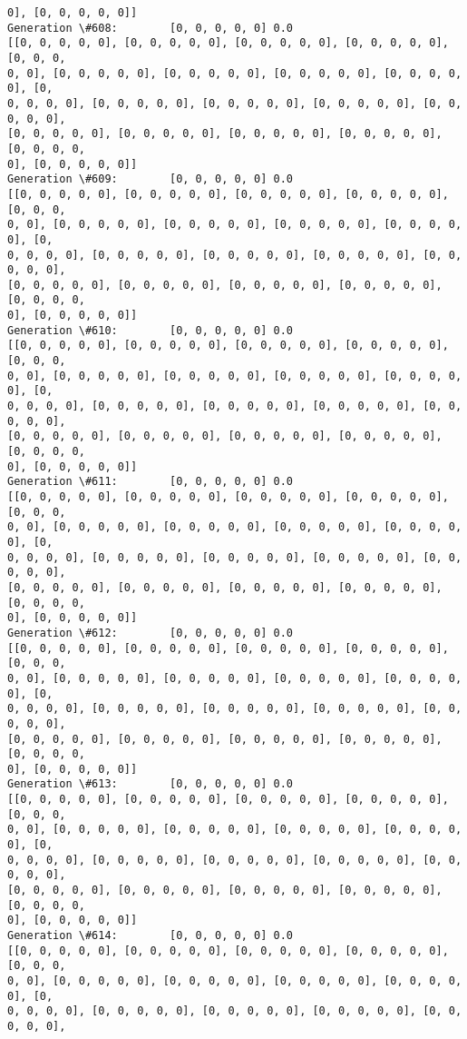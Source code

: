 \documentclass[11pt]{article}
\begin{document}
\begin{Verbatim}[commandchars=\\\{\}]
0], [0, 0, 0, 0, 0]]
Generation \#608:        [0, 0, 0, 0, 0] 0.0
[[0, 0, 0, 0, 0], [0, 0, 0, 0, 0], [0, 0, 0, 0, 0], [0, 0, 0, 0, 0], [0, 0, 0,
0, 0], [0, 0, 0, 0, 0], [0, 0, 0, 0, 0], [0, 0, 0, 0, 0], [0, 0, 0, 0, 0], [0,
0, 0, 0, 0], [0, 0, 0, 0, 0], [0, 0, 0, 0, 0], [0, 0, 0, 0, 0], [0, 0, 0, 0, 0],
[0, 0, 0, 0, 0], [0, 0, 0, 0, 0], [0, 0, 0, 0, 0], [0, 0, 0, 0, 0], [0, 0, 0, 0,
0], [0, 0, 0, 0, 0]]
Generation \#609:        [0, 0, 0, 0, 0] 0.0
[[0, 0, 0, 0, 0], [0, 0, 0, 0, 0], [0, 0, 0, 0, 0], [0, 0, 0, 0, 0], [0, 0, 0,
0, 0], [0, 0, 0, 0, 0], [0, 0, 0, 0, 0], [0, 0, 0, 0, 0], [0, 0, 0, 0, 0], [0,
0, 0, 0, 0], [0, 0, 0, 0, 0], [0, 0, 0, 0, 0], [0, 0, 0, 0, 0], [0, 0, 0, 0, 0],
[0, 0, 0, 0, 0], [0, 0, 0, 0, 0], [0, 0, 0, 0, 0], [0, 0, 0, 0, 0], [0, 0, 0, 0,
0], [0, 0, 0, 0, 0]]
Generation \#610:        [0, 0, 0, 0, 0] 0.0
[[0, 0, 0, 0, 0], [0, 0, 0, 0, 0], [0, 0, 0, 0, 0], [0, 0, 0, 0, 0], [0, 0, 0,
0, 0], [0, 0, 0, 0, 0], [0, 0, 0, 0, 0], [0, 0, 0, 0, 0], [0, 0, 0, 0, 0], [0,
0, 0, 0, 0], [0, 0, 0, 0, 0], [0, 0, 0, 0, 0], [0, 0, 0, 0, 0], [0, 0, 0, 0, 0],
[0, 0, 0, 0, 0], [0, 0, 0, 0, 0], [0, 0, 0, 0, 0], [0, 0, 0, 0, 0], [0, 0, 0, 0,
0], [0, 0, 0, 0, 0]]
Generation \#611:        [0, 0, 0, 0, 0] 0.0
[[0, 0, 0, 0, 0], [0, 0, 0, 0, 0], [0, 0, 0, 0, 0], [0, 0, 0, 0, 0], [0, 0, 0,
0, 0], [0, 0, 0, 0, 0], [0, 0, 0, 0, 0], [0, 0, 0, 0, 0], [0, 0, 0, 0, 0], [0,
0, 0, 0, 0], [0, 0, 0, 0, 0], [0, 0, 0, 0, 0], [0, 0, 0, 0, 0], [0, 0, 0, 0, 0],
[0, 0, 0, 0, 0], [0, 0, 0, 0, 0], [0, 0, 0, 0, 0], [0, 0, 0, 0, 0], [0, 0, 0, 0,
0], [0, 0, 0, 0, 0]]
Generation \#612:        [0, 0, 0, 0, 0] 0.0
[[0, 0, 0, 0, 0], [0, 0, 0, 0, 0], [0, 0, 0, 0, 0], [0, 0, 0, 0, 0], [0, 0, 0,
0, 0], [0, 0, 0, 0, 0], [0, 0, 0, 0, 0], [0, 0, 0, 0, 0], [0, 0, 0, 0, 0], [0,
0, 0, 0, 0], [0, 0, 0, 0, 0], [0, 0, 0, 0, 0], [0, 0, 0, 0, 0], [0, 0, 0, 0, 0],
[0, 0, 0, 0, 0], [0, 0, 0, 0, 0], [0, 0, 0, 0, 0], [0, 0, 0, 0, 0], [0, 0, 0, 0,
0], [0, 0, 0, 0, 0]]
Generation \#613:        [0, 0, 0, 0, 0] 0.0
[[0, 0, 0, 0, 0], [0, 0, 0, 0, 0], [0, 0, 0, 0, 0], [0, 0, 0, 0, 0], [0, 0, 0,
0, 0], [0, 0, 0, 0, 0], [0, 0, 0, 0, 0], [0, 0, 0, 0, 0], [0, 0, 0, 0, 0], [0,
0, 0, 0, 0], [0, 0, 0, 0, 0], [0, 0, 0, 0, 0], [0, 0, 0, 0, 0], [0, 0, 0, 0, 0],
[0, 0, 0, 0, 0], [0, 0, 0, 0, 0], [0, 0, 0, 0, 0], [0, 0, 0, 0, 0], [0, 0, 0, 0,
0], [0, 0, 0, 0, 0]]
Generation \#614:        [0, 0, 0, 0, 0] 0.0
[[0, 0, 0, 0, 0], [0, 0, 0, 0, 0], [0, 0, 0, 0, 0], [0, 0, 0, 0, 0], [0, 0, 0,
0, 0], [0, 0, 0, 0, 0], [0, 0, 0, 0, 0], [0, 0, 0, 0, 0], [0, 0, 0, 0, 0], [0,
0, 0, 0, 0], [0, 0, 0, 0, 0], [0, 0, 0, 0, 0], [0, 0, 0, 0, 0], [0, 0, 0, 0, 0],

\end{Verbatim}
\end{document}

